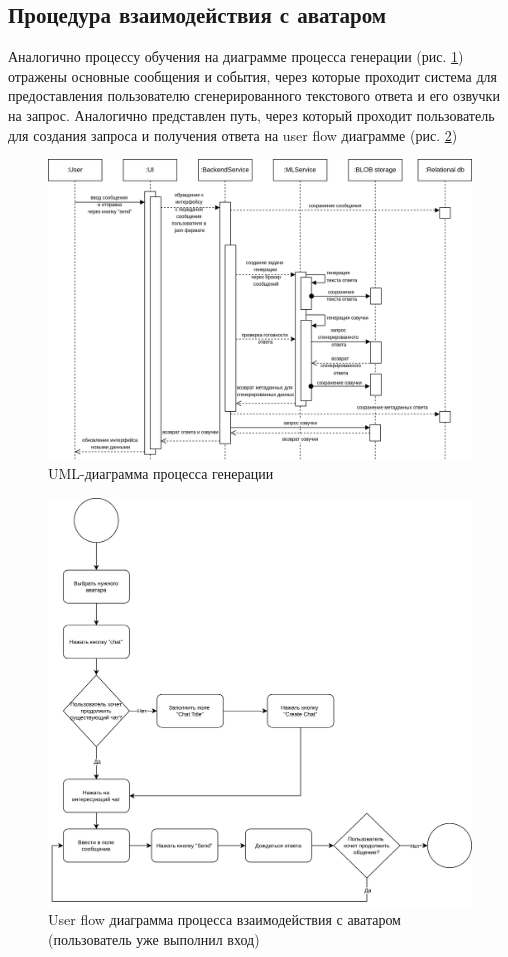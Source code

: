 \subsection{Процедура взаимодействия с аватаром}
Аналогично процессу обучения на диаграмме процесса генерации (рис. \ref{fig:uml-inference}) отражены основные сообщения и события, через которые проходит система для предоставления пользователю сгенерированного текстового ответа и его озвучки на запрос. Аналогично представлен путь, через который проходит пользователь для создания запроса и получения ответа на user flow диаграмме (рис. \ref{fig:uf-chat-with-avatar})

 \begin{figure}[h!]
     \centering
     \includegraphics[width=1.0\linewidth]{images/uml-inference-rus.png}
     \caption{UML-диаграмма процесса генерации}
     \label{fig:uml-inference}
 \end{figure}
 \begin{figure}[h!]
    \centering
    \includegraphics[width=1.0\linewidth]{images/UF-chat-with-avatar.png}
    \caption{User flow диаграмма процесса взаимодействия с аватаром (пользователь уже выполнил вход)}
    \label{fig:uf-chat-with-avatar}
\end{figure}

